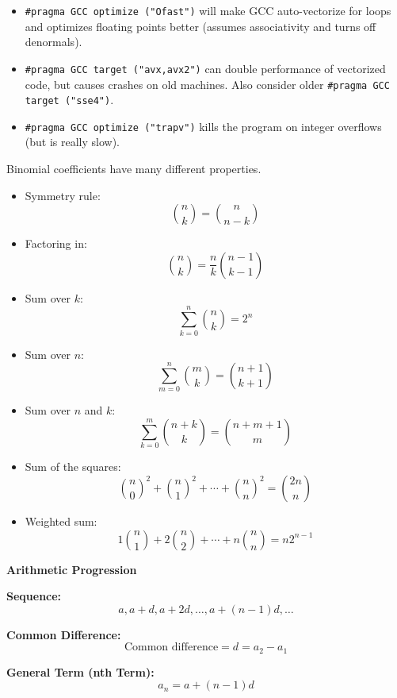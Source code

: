 \fontsize{12.5}{6}\ttfamily
\begin{itemize}[label=•]
    \item \texttt{\#pragma GCC optimize ("Ofast")} will make GCC auto-vectorize for loops and optimizes floating points better (assumes associativity and turns off denormals).
    \item \texttt{\#pragma GCC target ("avx,avx2")} can double performance of vectorized code, but causes crashes on old machines. Also consider older \texttt{\#pragma GCC target ("sse4")}.
    \item \texttt{\#pragma GCC optimize ("trapv")} kills the program on integer overflows (but is really slow).
\end{itemize}


Binomial coefficients have many different properties.
\begin{itemize}
    \item Symmetry rule:
    \[
    \binom{n}{k} = \binom{n}{n-k}
    \]

    \item Factoring in:
    \[
    \binom{n}{k} = \frac{n}{k} \binom{n-1}{k-1}
    \]

    \item Sum over $k$:
    \[
    \sum_{k=0}^{n} \binom{n}{k} = 2^n
    \]

    \item Sum over $n$:
    \[
    \sum_{m=0}^{n} \binom{m}{k} = \binom{n+1}{k+1}
    \]

    \item Sum over $n$ and $k$:
    \[
    \sum_{k=0}^{m} \binom{n+k}{k} = \binom{n+m+1}{m}
    \]

    \item Sum of the squares:
    \[
    \binom{n}{0}^2 + \binom{n}{1}^2 + \cdots + \binom{n}{n}^2 = \binom{2n}{n}
    \]

    \item Weighted sum:
    \[
    1 \binom{n}{1} + 2 \binom{n}{2} + \cdots + n \binom{n}{n} = n 2^{n-1}
    \]
\end{itemize}



\textbf{Arithmetic Progression}

\textbf{Sequence:}
\[ a, a+d, a+2d, \ldots, a+(n-1)d, \ldots \]

\textbf{Common Difference:}
\[ \text{Common difference} = d = a_2 - a_1 \]

\textbf{General Term (nth Term):}
\[ a_n = a + (n-1)d \]

